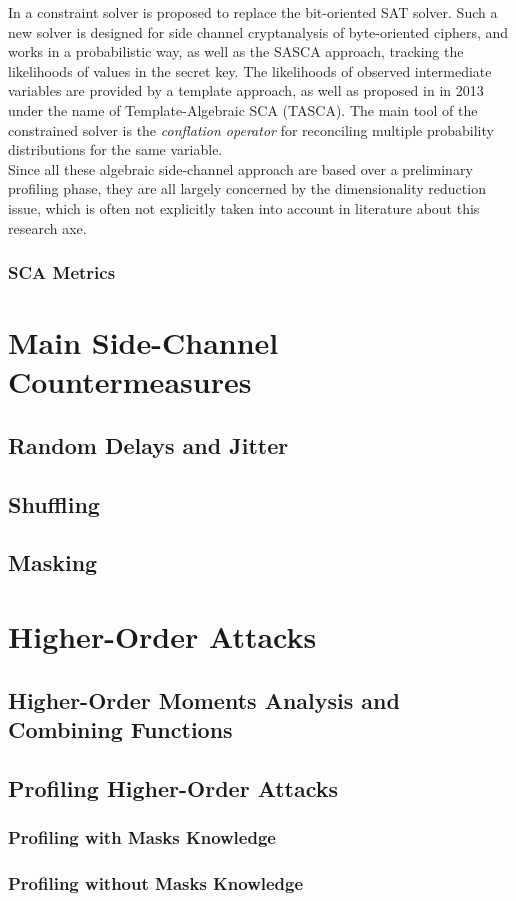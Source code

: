 In \cite{Oren2014} a constraint solver is proposed to replace the bit-oriented SAT solver. Such a new solver is designed for side channel cryptanalysis of byte-oriented ciphers, and works in a probabilistic way, as well as the SASCA approach, tracking the likelihoods of values in the secret key. The likelihoods of observed intermediate variables are provided by a template approach, as well as proposed in \cite{Oren:2013} in 2013 under the name of Template-Algebraic SCA (TASCA). The main tool  of the constrained solver is the \emph{conflation operator} for reconciling multiple probability distributions for the same variable.\\

Since all these algebraic side-channel approach are based over a preliminary profiling phase, they are all largely concerned by the dimensionality reduction issue, which is often not explicitly taken into account in literature about this research axe. 

\subsubsection{SCA Metrics}


\section{Main Side-Channel Countermeasures}\label{sec:countermeasures}
\subsection{Random Delays and Jitter}
\subsection{Shuffling}
\subsection{Masking}\label{sec:masking}



\section{Higher-Order Attacks}
\subsection{Higher-Order Moments Analysis and Combining Functions}
\subsection{Profiling Higher-Order Attacks}
\subsubsection{Profiling with Masks Knowledge}
\subsubsection{Profiling without Masks Knowledge}

